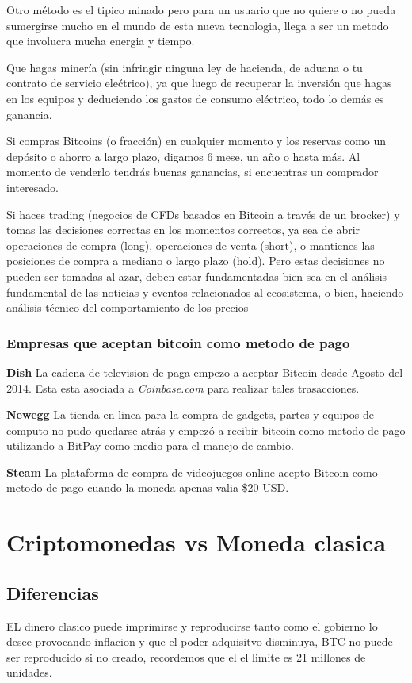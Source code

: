\documentclass[12pt,letterpaper]{article}
\begin{document}
	Otro m\'etodo es el tipico minado pero para un usuario que no quiere o no pueda sumergirse mucho en el mundo de esta nueva tecnologia, llega a ser un metodo que involucra mucha energia y tiempo.
	
        Que hagas minería (sin infringir ninguna ley de hacienda, de aduana o tu contrato de servicio elećtrico), ya que luego de recuperar la inversión que hagas en los equipos y deduciendo los gastos de consumo eléctrico, todo lo demás es ganancia.

        Si compras Bitcoins (o fracción) en cualquier momento y los reservas como un depósito o ahorro a largo plazo, digamos 6 mese, un año o hasta más. Al momento de venderlo tendrás buenas ganancias, si encuentras un comprador interesado.

        Si haces trading (negocios de CFDs basados en Bitcoin a través de un brocker) y tomas las decisiones correctas en los momentos correctos, ya sea de abrir operaciones de compra (long), operaciones de venta (short), o mantienes las posiciones de compra a mediano o largo plazo (hold).
        Pero estas decisiones no pueden ser tomadas al azar, deben estar fundamentadas bien sea en el análisis fundamental de las noticias y eventos relacionados al ecosistema, o bien, haciendo análisis técnico del comportamiento de los precios
            \subsubsection*{Empresas que aceptan bitcoin como metodo de pago}
\textbf{Dish}
La cadena de television de paga empezo a aceptar Bitcoin desde Agosto del 2014. Esta esta asociada a \textit{Coinbase.com} para realizar tales trasacciones.

\textbf{Newegg}
La tienda en linea para la compra de gadgets, partes y equipos de computo no pudo quedarse atr\'as y empez\'o a recibir bitcoin como metodo de pago utilizando a BitPay como medio para el manejo de cambio.

\textbf{Steam}
La plataforma de compra de videojuegos online acepto Bitcoin como metodo de pago cuando la moneda apenas valia \$20 USD.
\section*{Criptomonedas vs Moneda clasica}

	\subsection*{Diferencias}
	EL dinero clasico puede imprimirse y reproducirse tanto como el gobierno lo desee provocando inflacion y que el poder adquisitvo disminuya, BTC no puede ser reproducido si no creado, recordemos que el el limite es 21 millones de unidades.
	
\end{document}
